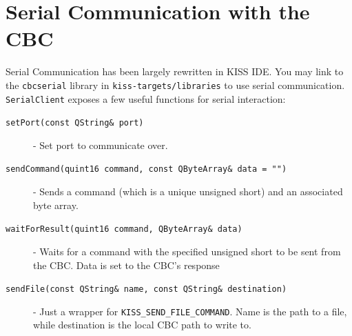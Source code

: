 \documentclass[7pt,letterpaper]{article}
\newcommand{\code}[1]{\texttt{#1}}
\begin{document}
	\section{Serial Communication with the CBC}
	Serial Communication has been largely rewritten in KISS IDE.
	You may link to the \code{cbcserial} library in \code{kiss-targets/libraries} to use serial communication.
	\code{SerialClient} exposes a few useful functions for serial interaction:
	
	\begin{description}
	\item[\code{setPort(const QString\& port)}] - Set port to communicate over.
	\item[\code{sendCommand(quint16 command, const QByteArray\& data = "")}] - 
	Sends a command (which is a unique unsigned short) and an associated byte array.
	\item[\code{waitForResult(quint16 command, QByteArray\& data)}] - 
	Waits for a command with the specified unsigned short to be sent from the CBC. 
	Data is set to the CBC's response
	\item[\code{sendFile(const QString\& name, const QString\& destination)}] - Just a wrapper for \code{KISS\_SEND\_FILE\_COMMAND}. 
	Name is the path to a file, while destination is the local CBC path to write to.
	\end{description}
	\singlespacing
	
\end{document}

